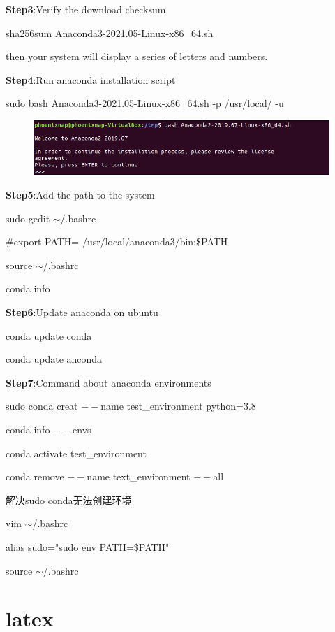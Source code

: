 \documentclass[11pt]{article}
\begin{document}
\begin{CJK}{UTF8}{gkai}
\textbf{Step3}:Verify the download checksum

sha256sum Anaconda3-2021.05-Linux-x86\_64.sh

then your system will display a series of letters and numbers.

\textbf{Step4}:Run anaconda installation script

sudo bash Anaconda3-2021.05-Linux-x86\_64.sh -p /usr/local/ -u 
\begin{figure}[h]
	\centering
	\includegraphics[scale=0.4]{anaconda1}
\end{figure}

\textbf{Step5}:Add the path to the system

sudo gedit $\sim$/.bashrc

\#export PATH= /usr/local/anaconda3/bin:\$PATH

source $\sim$/.bashrc

conda info

\textbf{Step6}:Update anaconda on ubuntu

conda update conda

conda update anconda

\textbf{Step7}:Command about anaconda environments

sudo conda creat $--$name test\_environment python=3.8 

conda info $--$envs

conda activate test\_environment

conda remove $--$name text\_environment $--$all 

解决sudo conda无法创建环境

vim $\sim$/.bashrc

alias sudo="sudo env PATH=\$PATH"

source $\sim$/.bashrc
\section{latex}
\end{CJK}
\end{document}
